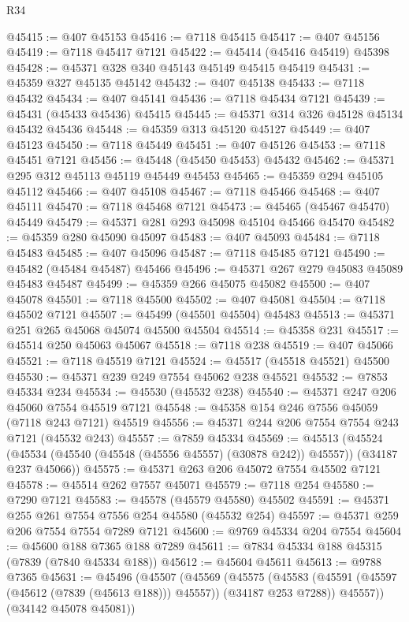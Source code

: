\begin{lexlean}{R34}
\begin{coremodule}
@45415 := @407 @45153
@45416 := @7118 @45415
@45417 := @407 @45156
@45419 := @7118 @45417 @7121
@45422 := @45414 (@45416 @45419) @45398
@45428 := @45371 @328 @340 @45143 @45149 @45415 @45419
@45431 := @45359 @327 @45135 @45142
@45432 := @407 @45138
@45433 := @7118 @45432
@45434 := @407 @45141
@45436 := @7118 @45434 @7121
@45439 := @45431 (@45433 @45436) @45415
@45445 := @45371 @314 @326 @45128 @45134 @45432 @45436
@45448 := @45359 @313 @45120 @45127
@45449 := @407 @45123
@45450 := @7118 @45449
@45451 := @407 @45126
@45453 := @7118 @45451 @7121
@45456 := @45448 (@45450 @45453) @45432
@45462 := @45371 @295 @312 @45113 @45119 @45449 @45453
@45465 := @45359 @294 @45105 @45112
@45466 := @407 @45108
@45467 := @7118 @45466
@45468 := @407 @45111
@45470 := @7118 @45468 @7121
@45473 := @45465 (@45467 @45470) @45449
@45479 := @45371 @281 @293 @45098 @45104 @45466 @45470
@45482 := @45359 @280 @45090 @45097
@45483 := @407 @45093
@45484 := @7118 @45483
@45485 := @407 @45096
@45487 := @7118 @45485 @7121
@45490 := @45482 (@45484 @45487) @45466
@45496 := @45371 @267 @279 @45083 @45089 @45483 @45487
@45499 := @45359 @266 @45075 @45082
@45500 := @407 @45078
@45501 := @7118 @45500
@45502 := @407 @45081
@45504 := @7118 @45502 @7121
@45507 := @45499 (@45501 @45504) @45483
@45513 := @45371 @251 @265 @45068 @45074 @45500 @45504
@45514 := @45358 @231
@45517 := @45514 @250 @45063 @45067
@45518 := @7118 @238
@45519 := @407 @45066
@45521 := @7118 @45519 @7121
@45524 := @45517 (@45518 @45521) @45500
@45530 := @45371 @239 @249 @7554 @45062 @238 @45521
@45532 := @7853 @45334 @234
@45534 := @45530 (@45532 @238)
@45540 := @45371 @247 @206 @45060 @7554 @45519 @7121
@45548 := @45358 @154 @246 @7556 @45059 (@7118 @243 @7121) @45519
@45556 := @45371 @244 @206 @7554 @7554 @243 @7121 (@45532 @243)
@45557 := @7859 @45334
@45569 := @45513
    (@45524 (@45534 (@45540 (@45548 (@45556 @45557) (@30878 @242)) @45557)) (@34187 @237 @45066))
@45575 := @45371 @263 @206 @45072 @7554 @45502 @7121
@45578 := @45514 @262 @7557 @45071
@45579 := @7118 @254
@45580 := @7290 @7121
@45583 := @45578 (@45579 @45580) @45502
@45591 := @45371 @255 @261 @7554 @7556 @254 @45580 (@45532 @254)
@45597 := @45371 @259 @206 @7554 @7554 @7289 @7121
@45600 := @9769 @45334 @204 @7554
@45604 := @45600 @188 @7365 @188 @7289
@45611 := @7834 @45334 @188 @45315 (@7839 (@7840 @45334 @188))
@45612 := @45604 @45611
@45613 := @9788 @7365
@45631 := @45496
    (@45507
      (@45569
        (@45575
          (@45583 (@45591 (@45597 (@45612 (@7839 (@45613 @188))) @45557)) (@34187 @253 @7288))
          @45557))
      (@34142 @45078 @45081))

\end{coremodule}
\end{lexlean}
